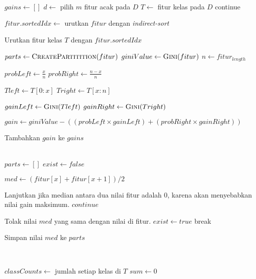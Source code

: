 \begin{center}
\begin{algorithmic}[1]
	\State {}
\EndFunction
\\
	\State $ gains \gets [] $
	\State $ d \gets $ pilih $m$ fitur acak pada $D$
	\State $ T \gets $ fitur kelas pada $D$
			\State continue
		\EndIf

		\State $ fitur.sortedIdx \gets $ urutkan $fitur$ dengan
		\textit{indirect-sort}

		\State Urutkan fitur kelas $T$ dengan $fitur.sortedIdx$

		\State $ parts \gets \Call{CreatePartitition}{fitur} $
		\State $ giniValue \gets \Call{Gini}{fitur} $
		\State $ n \gets fitur_{length} $

			\State $ probLeft \gets \frac{x}{n} $
			\State $ probRight \gets \frac{n-x}{n} $

			\State $ Tleft \gets T[0:x] $
			\State $ Tright \gets T[x:n] $

			\State $ gainLeft \gets \Call{Gini}{Tleft} $
			\State $ gainRight \gets \Call{Gini}{Tright} $

			\State $ gain \gets giniValue - ((probLeft \times gainLeft) +
			(probRight \times gainRight)) $

			\State Tambahkan $gain$ ke $gains$
		\EndFor
	\EndFor

	\State {}
\EndFunction
\\
	\State $ parts \gets [] $
	\State $ exist \gets false $

		\State $ med \gets (fitur[x] + fitur[x+1]) / 2 $

			\Comment Lanjutkan jika median antara dua nilai fitur
			adalah 0, karena akan menyebabkan nilai gain maksimum.
			\State $continue$
		\EndIf

				\Comment Tolak nilai $med$ yang sama dengan
				nilai di fitur.
				\State $ exist \gets true $
				\State break
			\EndIf
		\EndFor

			\State Simpan nilai $med$ ke $parts$
		\EndIf
	\EndFor

	\State {}
\EndFunction
\\
		\State {}
	\EndIf

	\State $ classCounts \gets $ jumlah setiap kelas di $T$
	\State $ sum \gets 0 $


\end{algorithmic}
\end{center}
